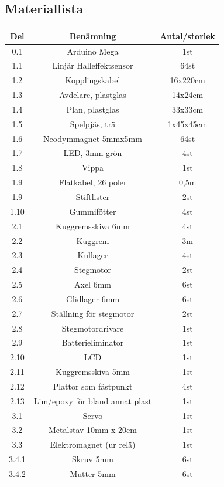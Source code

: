 \documentclass[a4paper]{article}
\begin{document}
\begin{appendix}
\section{Materiallista}
    \begin{table}
        \begin{tabular}{ | c | c | c | }
\hline
Del & Benämning & Antal/storlek \\
\hline
\hline
0.1 & Arduino Mega & 1st \\
1.1 & Linjär Halleffektsensor & 64st \\
1.2 & Kopplingskabel & 16x220cm \\
1.3 & Avdelare, plastglas & 14x24cm \\
1.4 & Plan, plastglas & 33x33cm \\
1.5 & Spelpjäs, trä & 1x45x45cm \\
1.6 & Neodymmagnet 5mmx5mm & 64st \\
1.7 & LED, 3mm grön & 4st \\
1.8 & Vippa & 1st \\
1.9 & Flatkabel, 26 poler & 0,5m \\
1.9 & Stiftlister & 2st \\
1.10 & Gummifötter & 4st \\
2.1 & Kuggremsskiva 6mm & 4st \\
2.2 & Kuggrem & 3m \\
2.3 & Kullager & 4st \\
2.4 & Stegmotor & 2st \\
2.5 & Axel 6mm & 6st \\
2.6 & Glidlager 6mm & 6st \\
2.7 & Ställning för stegmotor & 2st \\
2.8 & Stegmotordrivare & 1st \\
2.9 & Batterieliminator & 1st \\
2.10 & LCD & 1st \\
2.11 & Kuggremsskiva 5mm & 1st \\
2.12 & Plattor som fästpunkt & 4st \\
2.13 & Lim/epoxy för bland annat plast & 1st \\
3.1 & Servo & 1st \\
3.2 & Metalstav 10mm x 20cm & 1st \\
3.3 & Elektromagnet (ur relä) & 1st \\
3.4.1 & Skruv 5mm & 6st \\
3.4.2 & Mutter 5mm & 6st \\
\hline
        \end{tabular}
    \end{table}

\end{appendix}
\end{document}
